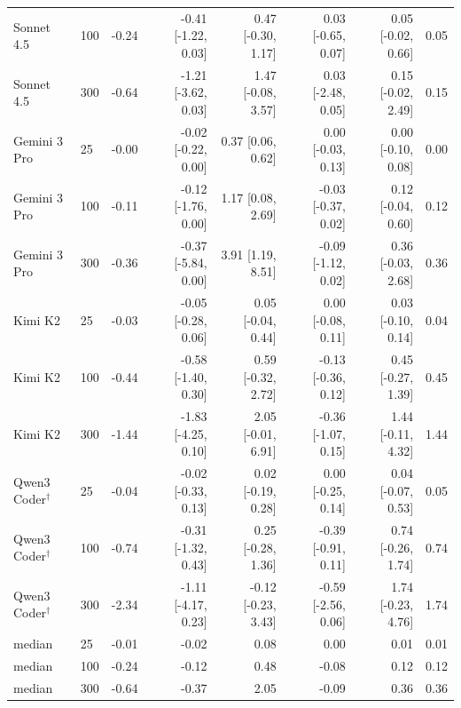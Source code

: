 \begin{table}[t]
\begin{tabular}{llrrrrrr}
Sonnet 4.5 & 100 & -0.24 & -0.41 [-1.22, 0.03] & 0.47 [-0.30, 1.17] & 0.03 [-0.65, 0.07] & 0.05 [-0.02, 0.66] & 0.05 \\
Sonnet 4.5 & 300 & -0.64 & -1.21 [-3.62, 0.03] & 1.47 [-0.08, 3.57] & 0.03 [-2.48, 0.05] & 0.15 [-0.02, 2.49] & 0.15 \\
\midrule
Gemini 3 Pro & 25 & -0.00 & -0.02 [-0.22, 0.00] & 0.37 [0.06, 0.62] & 0.00 [-0.03, 0.13] & 0.00 [-0.10, 0.08] & 0.00 \\
Gemini 3 Pro & 100 & -0.11 & -0.12 [-1.76, 0.00] & 1.17 [0.08, 2.69] & -0.03 [-0.37, 0.02] & 0.12 [-0.04, 0.60] & 0.12 \\
Gemini 3 Pro & 300 & -0.36 & -0.37 [-5.84, 0.00] & 3.91 [1.19, 8.51] & -0.09 [-1.12, 0.02] & 0.36 [-0.03, 2.68] & 0.36 \\
\midrule
Kimi K2 & 25 & -0.03 & -0.05 [-0.28, 0.06] & 0.05 [-0.04, 0.44] & 0.00 [-0.08, 0.11] & 0.03 [-0.10, 0.14] & 0.04 \\
Kimi K2 & 100 & -0.44 & -0.58 [-1.40, 0.30] & 0.59 [-0.32, 2.72] & -0.13 [-0.36, 0.12] & 0.45 [-0.27, 1.39] & 0.45 \\
Kimi K2 & 300 & -1.44 & -1.83 [-4.25, 0.10] & 2.05 [-0.01, 6.91] & -0.36 [-1.07, 0.15] & 1.44 [-0.11, 4.32] & 1.44 \\
\midrule
Qwen3 Coder$^\dagger$ & 25 & -0.04 & -0.02 [-0.33, 0.13] & 0.02 [-0.19, 0.28] & 0.00 [-0.25, 0.14] & 0.04 [-0.07, 0.53] & 0.05 \\
Qwen3 Coder$^\dagger$ & 100 & -0.74 & -0.31 [-1.32, 0.43] & 0.25 [-0.28, 1.36] & -0.39 [-0.91, 0.11] & 0.74 [-0.26, 1.74] & 0.74 \\
Qwen3 Coder$^\dagger$ & 300 & -2.34 & -1.11 [-4.17, 0.23] & -0.12 [-0.23, 3.43] & -0.59 [-2.56, 0.06] & 1.74 [-0.23, 4.76] & 1.74 \\
\midrule
median & 25 & -0.01 & -0.02 & 0.08 & 0.00 & 0.01 & 0.01 \\
median & 100 & -0.24 & -0.12 & 0.48 & -0.08 & 0.12 & 0.12 \\
median & 300 & -0.64 & -0.37 & 2.05 & -0.09 & 0.36 & 0.36 \\
\bottomrule
\end{tabular}
\end{table}

